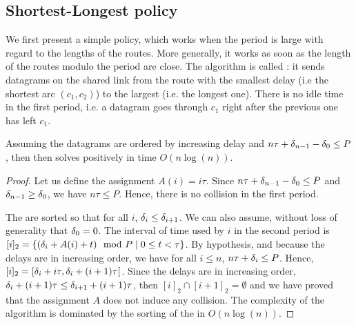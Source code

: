   \subsection{Shortest-Longest policy}
   


    We first present a simple policy, which works when the period is large with regard to the lengths of the routes. More generally, it works as soon as the length of the routes modulo the period are close. The algorithm is called \shortestlongest: it sends datagrams on the shared link from the route with the smallest delay (i.e the shortest arc $(c_1,c_2)$) to the largest (i.e. the longest one). There is no idle time in the first period, i.e. a datagram goes through $c_1$ right after the previous one has left $c_1$.

      \begin{proposition} Assuming the datagrams are ordered by increasing delay and $n\tau + \delta_{n-1} - \delta_0 \leq P$, then then \shortestlongest solves \pma positively in time $O(n\log(n))$.\label{prop:SL}
      \end{proposition}
      \begin{proof}
      Let us define the assignment $A(i) = i \tau$. Since $n\tau + \delta_{n-1} - \delta_0 \leq P$ and $\delta_{n-1} \geq \delta_0$, we have $n\tau \leq P$. Hence, there is no collision in the first period.

      The \nomdelaypluriel are sorted so that for all $i$, $\delta_i \leq \delta_{i+1}$. We can also assume, without loss of generality that $\delta_0 = 0$. The interval of time used by $i$ in the second period is $[i]_2 = \{ (\delta_i + A(i) + t) \mod P \mid 0 \leq t < \tau \}$. By hypothesis, and because the delays are in increasing order, we have for all $i\leq n$, $n\tau + \delta_{i} \leq P$. Hence, $[i]_2 = [\delta_i + i\tau, \delta_i + (i+1)\tau[$. Since the delays are in increasing order, $\delta_i + (i+1)\tau \leq \delta_{i+1} + (i+1)\tau$, then $[i]_2 \cap [i+1]_2 = \emptyset$
      and we have proved that the assignment $A$ does not induce any collision.
        The complexity of the algorithm is dominated by the sorting of the \nomdelaypluriel in $O(n\log(n))$. 
      
      \end{proof}
